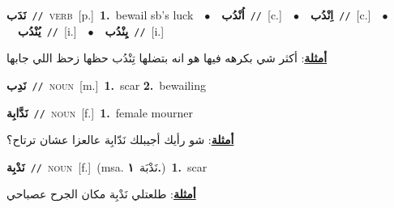 \documentclass[10pt,a4paper,twoside]{article} %
\begin{document}
\begin{multicols}{2}
{\setlength\topsep{0pt}\textbf{\foreignlanguage{arabic}{نَدَب}}\ {\color{gray}\texttt{//}\color{black}}\ \textsc{verb}\ [p.]\ \textbf{1.}~bewail sb's luck\ \ $\bullet$\ \ \setlength\topsep{0pt}\textbf{\foreignlanguage{arabic}{اُنْدُب}}\ {\color{gray}\texttt{//}\color{black}}\ [c.]\ \ $\bullet$\ \ \setlength\topsep{0pt}\textbf{\foreignlanguage{arabic}{اِنْدُب}}\ {\color{gray}\texttt{//}\color{black}}\ [c.]\ \ $\bullet$\ \ \setlength\topsep{0pt}\textbf{\foreignlanguage{arabic}{يُنْدُب}}\ {\color{gray}\texttt{//}\color{black}}\ [i.]\ \ $\bullet$\ \ \setlength\topsep{0pt}\textbf{\foreignlanguage{arabic}{يِنْدُب}}\ {\color{gray}\texttt{//}\color{black}}\ [i.]\  \begin{flushright}\color{gray}\foreignlanguage{arabic}{\textbf{\underline{\foreignlanguage{arabic}{أمثلة}}}: أكثر شي بكرهه فيها هو انه بتضلها تِنْدُب حظها زحظ اللي جابها}\end{flushright}\color{black}} \vspace{2mm}

{\setlength\topsep{0pt}\textbf{\foreignlanguage{arabic}{نَدِب}}\ {\color{gray}\texttt{//}\color{black}}\ \textsc{noun}\ [m.]\ \textbf{1.}~scar  \textbf{2.}~bewailing\ } \vspace{2mm}

{\setlength\topsep{0pt}\textbf{\foreignlanguage{arabic}{نَدَّابِة}}\ {\color{gray}\texttt{//}\color{black}}\ \textsc{noun}\ [f.]\ \textbf{1.}~female mourner\  \begin{flushright}\color{gray}\foreignlanguage{arabic}{\textbf{\underline{\foreignlanguage{arabic}{أمثلة}}}: شو رأيك أجيبلك نَدّابِة عالعزا عشان ترتاح؟}\end{flushright}\color{black}} \vspace{2mm}

{\setlength\topsep{0pt}\textbf{\foreignlanguage{arabic}{نَدْبِة}}\ {\color{gray}\texttt{//}\color{black}}\ \textsc{noun}\ [f.]\ \color{gray}(msa. \foreignlanguage{arabic}{نَدْبَة}~\foreignlanguage{arabic}{\textbf{١.}})\color{black}\ \textbf{1.}~scar\  \begin{flushright}\color{gray}\foreignlanguage{arabic}{\textbf{\underline{\foreignlanguage{arabic}{أمثلة}}}: طلعتلي نَدْبِة مكان الجرح عصباحي}\end{flushright}\color{black}} \vspace{2mm}


\end{multicols}
\end{document}

